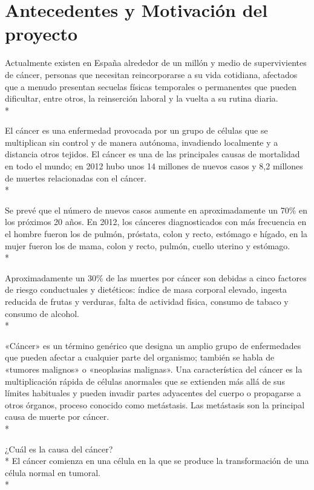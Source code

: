 \documentclass[../pfc.tex]{subfiles}
\begin{document}
\section{Antecedentes y Motivación del proyecto}
Actualmente existen en España alrededor de un millón y medio de supervivientes de cáncer, personas que necesitan reincorporarse a su vida cotidiana, afectados que a menudo presentan secuelas físicas temporales o permanentes que pueden dificultar, entre otros, la reinserción laboral y la vuelta a su rutina diaria\cite{gepacsuper}.\\*

El cáncer es una enfermedad provocada por un grupo de células que se multiplican sin control y de manera autónoma, invadiendo localmente y a distancia otros tejidos. El cáncer es una de las principales causas de mortalidad en todo el mundo; en 2012 hubo unos 14 millones de nuevos casos y 8,2 millones de muertes relacionadas con el cáncer.\\*

Se prevé que el número de nuevos casos aumente en aproximadamente un 70\% en los próximos 20 años. En 2012, los cánceres diagnosticados con más frecuencia en el hombre fueron los de pulmón, próstata, colon y recto, estómago e hígado, en la mujer fueron los de mama, colon y recto, pulmón, cuello uterino y estómago.\cite{omsintro}\\*

Aproximadamente un 30\% de las muertes por cáncer son debidas a cinco factores de riesgo conductuales y dietéticos: índice de masa corporal elevado, ingesta reducida de frutas y verduras, falta de actividad física, consumo de tabaco y consumo de alcohol.\\*

«Cáncer» es un término genérico que designa un amplio grupo de enfermedades que pueden afectar a cualquier parte del organismo; también se habla de «tumores malignos» o «neoplasias malignas». Una característica del cáncer es la multiplicación rápida de células anormales que se extienden más allá de sus límites habituales y pueden invadir partes adyacentes del cuerpo o propagarse a otros órganos, proceso conocido como metástasis. Las metástasis son la principal causa de muerte por cáncer.\\*

¿Cuál es la causa del cáncer?\\*
El cáncer comienza en una célula en la que se produce la transformación de una célula normal en tumoral.\\*
\end{document}
